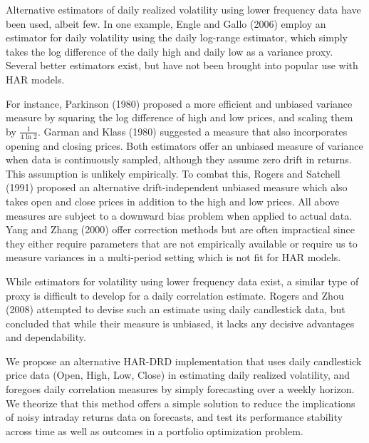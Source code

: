 \documentclass{article}
\begin{document}
Alternative estimators of daily realized volatility using lower frequency data have been used, albeit few.
In one example, Engle and Gallo (2006)\cite{Engle2006} employ an estimator for daily volatility using
the daily log-range estimator, which simply takes the log
difference of the daily high and daily low as a variance proxy. Several better estimators exist, 
but have not been brought into popular use with HAR models.

For instance, Parkinson (1980)\cite{Parkinson1980} proposed a more efficient and unbiased variance
measure by squaring the log difference of high and low prices,
and scaling them by $\frac{1}{4\ln{2}}$. Garman and Klass (1980)\cite{Garman1980} suggested a measure that also incorporates
opening and closing prices. Both estimators offer an unbiased 
measure of variance when data is continuously sampled, although 
they assume zero drift in returns. This assumption is unlikely 
empirically. To combat this, Rogers and Satchell (1991)\cite{Rogers1991} proposed 
an alternative drift-independent unbiased measure which also takes open 
and close prices in addition to the high and low prices. All above
measures are subject to a downward bias problem when applied to
actual data. Yang and Zhang (2000)\cite{Yang2000} offer correction methods but
are often impractical since they either require parameters that are 
not empirically available or require us to measure variances 
in a multi-period setting which is not fit for HAR models.

While estimators for volatility using lower frequency data exist, a similar type
of proxy is difficult to develop for a daily correlation estimate. Rogers and Zhou (2008)\cite{Rogers2008} 
attempted to devise such an estimate using daily candlestick data, but concluded that
while their measure is unbiased, it lacks any decisive advantages and dependability.

We propose an alternative HAR-DRD implementation that uses daily candlestick price data (Open, High, Low, Close)
in estimating daily realized volatility, and foregoes daily correlation measures by simply forecasting over 
a weekly horizon. We theorize that this method offers a simple solution to reduce the implications
of noisy intraday returns data on forecasts, and test its performance stability across time as well as outcomes 
in a portfolio optimization problem.
 
\end{document}
